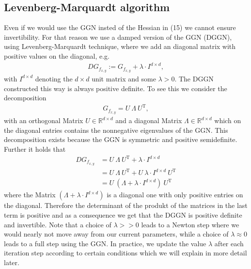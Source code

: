 \documentclass[conference]{IEEEtran}
\begin{document}
\subsection{Levenberg-Marquardt algorithm }
Even if we would use the GGN insted of the Hessian in (15) we cannot ensure invertibility. %
For that reason we use a damped version of the GGN (DGGN), using Levenberg-Marquardt technique, where we add an diagonal matrix with positive values on the diagonal, e.g.
\begin{align}
DG_{f_{x, y}} := G_{f_{x, y}} + \lambda\cdot I^{d\times d},
\end{align}
with $I^{d\times d}$ denoting the $d\times d$ unit matrix and some $\lambda>0$.
The DGGN constructed this way is always positive definite. 
To see this we consider the decomposition
\begin{align}
G_{f_{x, y}} = U\:\Lambda\:U^{\mathrm{T}},
\end{align}
with an orthogonal Matrix $U\in\mathbb{R}^{d\times d}$ and a diagonal Matrix $\Lambda\in\mathbb{R}^{d\times d}$ which on the diagonal entries contains the nonnegative eigenvalues of the GGN. This decomposition exists because the GGN is symmetric and positive semidefinite. Further it holds that
\begin{align}
DG_{f_{x, y}} &= U\:\Lambda\:U^{\mathrm{T}} + \lambda\cdot I^{d\times d}\\
&= U\:\Lambda\:U^{\mathrm{T}} + U\:\lambda\cdot I^{d\times d}\:U^{\mathrm{T}}\\
&= U\:\left(\Lambda + \lambda\cdot I^{d\times d}\right)\:U^{\mathrm{T}}
\end{align}
where the Matrix $\left(\Lambda + \lambda\cdot I^{d\times d}\right)$ is a diagonal one with only positive entries on the diagonal. Therefore the determinant of the produkt of the matrices in the last term is positive and as a consequence we get that the DGGN is positive definite and invertible.
Note that a choice of $\lambda>>0$ leads to a Newton step where we would nearly not move away from our current parameters, while a choice of $\lambda\approx 0$ leads to a full step using the GGN. In practice, we update the value $\lambda$ after each iteration step according to certain conditions which we will explain in more detail later.
\end{document}
